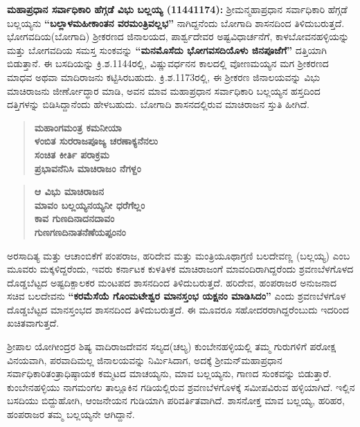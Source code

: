 \textbf{ಮಹಾಪ್ರಧಾನ ಸರ್ವಾಧಿಕಾರಿ ಹೆಗ್ಗಡೆ ವಿಭು ಬಲ್ಲಯ್ಯ (1144\general{\enginline{-}}1174):} ಶ‍್ರೀಮನ್ಮಹಾಪ್ರಧಾನ ಸರ್ವಾಧಿಕಾರಿ ಹೆಗ್ಗಡೆ ಬಲ್ಲಯ್ಯನು \textbf{“ಬಲ್ಲಾಳಮಹೀಕಾಂತನ ವರಮಂತ್ರಿವಲ್ಲಭ”} ನಾಗಿದ್ದನೆಂದು ಬೋಗಾದಿ ಶಾಸನದಿಂದ ತಿಳಿದುಬರುತ್ತದೆ. ಭೋಗವದಿಯ(ಬೋಗಾದಿ) ಶ‍್ರೀಕರಣದ ಜಿನಾಲಯದ, ಪಾರ್ಶ್ವದೇವರ ಅಷ್ಟವಿಧಾರ್ಚನೆಗೆ, ಕಾಳಬೋವನಹಳ್ಳಿಯನ್ನು ಮತ್ತು ಬೋಗವದಿಯ ಸಮಸ್ತ ಸುಂಕವನ್ನು \textbf{“ಮನಮೊಸೆದು ಭೋಗವಸದಿಯೊಳು ಜಿನಪೂಜೆಗೆ”} ದತ್ತಿಯಾಗಿ ಬಿಡುತ್ತಾನೆ. ಈ ಬಸದಿಯನ್ನು ಕ್ರಿ.ಶ.1144ರಲ್ಲಿ, ವಿಷ್ಣುವರ್ಧನನ ಕಾಲದಲ್ಲಿ ವೋಣಮಯ್ಯನ ಮಗ ಶ‍್ರೀಕರಣದ ಮಾಧವ ಅಥವಾ ಮಾದಿರಾಜನು ಕಟ್ಟಿಸಿರಬಹುದು. ಕ್ರಿ.ಶ.1173ರಲ್ಲಿ, ಈ ಶ‍್ರೀಕರಣ ಜಿನಾಲಯವನ್ನು ವಿಭು ಮಾಚಿರಾಜನು ಜೀರ್ಣೋದ್ಧಾರ ಮಾಡಿ, ಅವನ ಮಾವ ಮಹಾಪ್ರಧಾನ ಸರ್ವಾಧಿಕಾರಿ ಬಲ್ಲಯ್ಯನ ಹಸ್ತದಿಂದ ದತ್ತಿಗಳನ್ನು ಬಿಡಿಸಿದ್ದಾನೆಂದು ಹೇಳಬಹುದು. ಬೋಗಾದಿ ಶಾಸನದಲ್ಲಿರುವ ಮಾಚಿರಾಜನ ಸ್ತುತಿ ಹೀಗಿದೆ.

\begin{verse}
\textbf{ಮಹಾಂಗಮಂತ್ರ ಕಮನೀಯಾ} \\\textbf{ ಳಂಬಿತ ಸುರರಾಜಪೂಜ್ಯ ಚರಣಾಕ್ಯನೆನಲು} \\\textbf{ ಸಂಚಿತ ಕೀರ್ತಿ ಪರಾಕ್ರಮ}\\\textbf{ ಪ್ರಭಾವನೆನಿಸಿ ಮಾಚಿರಾಜಂ ನೆಗಳ್ದಂ}
\end{verse}

\begin{verse}
\textbf{ಆ ವಿಭು ಮಾಚಿರಾಜನ} \\\textbf{ ಮಾವಂ ಬಲ್ಲಯ್ಯನಯ್ಯನೀ ಧರೆಗೆಲ್ಲಂ} \\\textbf{ಕಾವ ಗುಣದಿನಾದನದಾವಂ} \\\textbf{ ಗುಣಗಣದಿನಾತನೆಣೆಯಪ್ಪಂನಂ}
\end{verse}

ಅರಸಾದಿತ್ಯ ಮತ್ತು ಆಚಾಂಬಿಕೆಗೆ ಪಂಪರಾಜ, ಹರಿದೇವ ಮತ್ತು ಮಂತ್ರಿಯೂಥಾಗ್ರಣಿ ಬಲದೇವಣ್ಣ (ಬಲ್ಲಯ್ಯ) ಎಂಬ ಮೂವರು ಮಕ್ಕಳಿದ್ದರೆಂದು, ಇವರು ಕರ್ನಾಟಕ ಕುಳತಿಳಕ ಮಾಚಿರಾಜಂಗೆ ಮಾವಂದಿರಾಗಿದ್ದರೆಂದು ಶ್ರವಣಬೆಳಗೊಳದ ದೊಡ್ಡಬೆಟ್ಟದ ಅಷ್ಟದಿಕ್ಪಾಲಕರ ಮಂಟಪದ ಶಾಸನದಿಂದ ತಿಳಿದುಬರುತ್ತದೆ. ಹರಿದೇವ, ಹಂಪರಾಜರ ಅನುಜನಾದ ಸಚಿವ ಬಲದೇವನು \textbf{“ಕರಮೆಸೆಯೆ ಗೊಂಮಟೇಶ್ವರ ಮಾನಸ್ತಂಭ ಯಕ್ಷನಂ ಮಾಡಿಸಿದಂ”} ಎಂದು ಶ್ರವಣಬೆಳಗೊಳ ದೊಡ್ಡಬೆಟ್ಟದ ಮಾನಸ್ತಂಭದ ಶಾಸನದಿಂದ ತಿಳಿದುಬರುತ್ತದೆ. ಈ ಮೂವರೂ ಸಹೋದರರಾಗಿದ್ದರೆಂಬುದು ಇದರಿಂದ ಖಚಿತವಾಗುತ್ತದೆ.

ಶ‍್ರೀಪಾಲ ಯೋಗೀಂದ್ರರ ಶಿಷ್ಯ ವಾದಿರಾಜದೇವನ ಸಲ್ಯದ(ಚಲ್ಯ) ಕುಂಬೇನಹಳ್ಳಿಯಲ್ಲಿ ತಮ್ಮ ಗುರುಗಳಿಗೆ ಪರೋಕ್ಷ ವಿನಯವಾಗಿ, ಪರವಾದಿಮಲ್ಲ ಜಿನಾಲಯವನ್ನು ನಿರ್ಮಿಸಿದಾಗ, ಅದಕ್ಕೆ ಶ‍್ರೀಮನ್​ಮಹಾಪ್ರಧಾನ ಸರ್ವಾಧಿಕಾರಿ\break ತಂತ್ರಾಧಿಷ್ಠಾಯಕ ಕಮ್ಮಟದ ಮಾಚಯ್ಯನು, ಮಾವ ಬಲ್ಲಯ್ಯನು, ಗಾಣದ ಸುಂಕವನ್ನು ಬಿಡುತ್ತಾರೆ. ಕುಂಬೇನಹಳ್ಳಿಯು ನಾಗಮಂಗಲ ತಾಲ್ಲೂಕಿನ ಗಡಿಯಲ್ಲಿರುವ ಶ್ರವಣಬೆಳಗೊಳಕ್ಕೆ ಸಮೀಪವಿರುವ ಹಳ್ಳಿಯಾಗಿದೆ. ಇಲ್ಲಿನ ಬಸದಿಯು ಬಿದ್ದುಹೋಗಿ, ಆಂಜನೇಯನ ಗುಡಿಯಾಗಿ ಪರಿವರ್ತಿತವಾಗಿದೆ. ಶಾಸನೋಕ್ತ ಮಾವ ಬಲ್ಲಯ್ಯ, ಹರಿಹರ, ಹಂಪರಾಜರ ತಮ್ಮ ಬಲ್ಲಯ್ಯನೇ ಆಗಿದ್ದಾನೆ.

